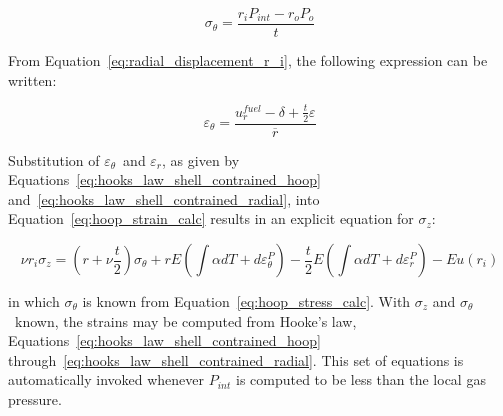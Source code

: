 \begin{equation}
    \label{eq:hoop_stress_calc}
    \sigma_{\theta} = \frac{r_{i}P_{int}-r_{o}P_{o}}{t}
\end{equation}

From Equation~\ref{eq:radial_displacement_r_i}, the following expression
can be written:

\begin{equation}
    \label{eq:hoop_strain_calc}
    \varepsilon_{\theta} = \frac{u^{fuel}_{r} - \delta + \frac{t}{2}\varepsilon}{\overline{r}}
\end{equation}

Substitution of $\varepsilon_{\theta}$~and $\varepsilon_{r}$, as given by
Equations~\ref{eq:hooks_law_shell_contrained_hoop} and~\ref{eq:hooks_law_shell_contrained_radial},
into Equation~\ref{eq:hoop_strain_calc} results in an explicit equation for
$\sigma_{z}$:

\begin{equation} 
    \nu r_i \sigma_z=\left(r+\nu \frac{t}{2} \right) \sigma_{\theta}+rE \left( \int \alpha dT+d \varepsilon_{\theta}^P \right)-\frac{t}{2}E \left( \int \alpha dT+d \varepsilon_r^P \right)-Eu(r_i)
\end{equation}

in which $\sigma_{\theta}$ is known from Equation~\ref{eq:hoop_stress_calc}.  With $\sigma_{z}$ and
$\sigma_{\theta}$~known, the strains may be computed from Hooke's law,
Equations~\ref{eq:hooks_law_shell_contrained_hoop}
through~\ref{eq:hooks_law_shell_contrained_radial}.  This set of equations is automatically invoked
whenever $P_{int}$ is computed to be less than the local gas pressure.

